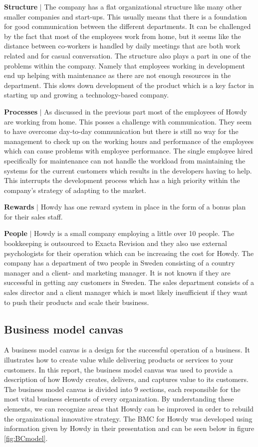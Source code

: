 \noindent \textbf{Structure} $|$ The company has a flat organizational structure like many other smaller companies and start-ups. This usually means that there is a foundation for good communication between the different departments. It can be challenged by the fact that most of the employees work from home, but it seems like the distance between co-workers is handled by daily meetings that are both work related and for casual conversation. The structure also plays a part in one of the problems within the company. Namely that employees working in development end up helping with maintenance as there are not enough resources in the department. This slows down development of the product which is a key factor in starting up and growing a technology-based company.

\noindent \textbf{Processes} $|$ As discussed in the previous part most of the employees of Howdy are working from home. This posses a challenge with communication. They seem to have overcome day-to-day communication but there is still no way for the management to check up on the working hours and performance of the employees which can cause problems with employee performance. The single employee hired specifically for maintenance can not handle the workload from maintaining the systems for the current customers which results in the developers having to help. This interrupts the development process which has a high priority within the company’s strategy of adapting to the market.

\noindent \textbf{Rewards} $|$ Howdy has one reward system in place in the form of a bonus plan for their sales staff.

\noindent \textbf{People} $|$ Howdy is a small company employing a little over 10 people. The bookkeeping is outsourced to Exacta Revision and they also use external psychologists for their operation which can be increasing the cost for Howdy.
The company has a department of two people in Sweden consisting of a country manager and a client- and marketing manager. It is not known if they are successful in getting any customers in Sweden.
The sales department consists of a sales director and a client manager which is most likely insufficient if they want to push their products and scale their business.


\subsection{Business model canvas}
A business model canvas is a design for the successful operation of a business. It illustrates how to create value while delivering products or services to your customers. In this report, the business model canvas was used to provide a description of how Howdy creates, delivers, and captures value to its customers. The business model canvas is divided into 9 sections, each responsible for the most vital business elements of every organization. By understanding these elements, we can recognize areas that Howdy can be improved in order to rebuild the organizational innovative strategy. The BMC for Howdy was developed using information given by Howdy in their presentation \cite{oneofthepresentations} and can be seen below in figure \ref{fig:BCmodel}.

